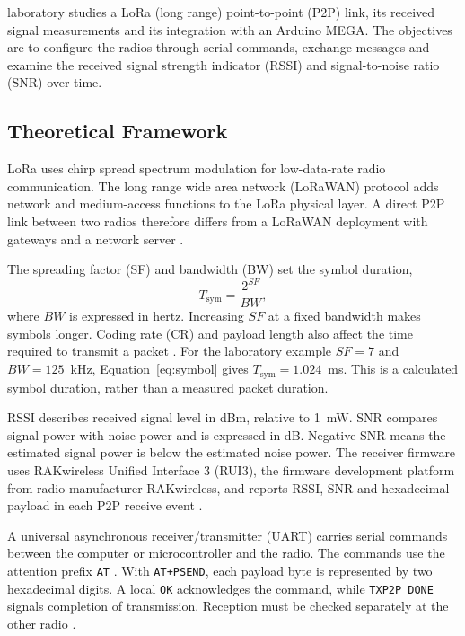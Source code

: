  laboratory studies a LoRa (long range) point-to-point (P2P) link, its received signal measurements and its integration with an Arduino MEGA. The objectives are to configure the radios through serial commands, exchange messages and examine the received signal strength indicator (RSSI) and signal-to-noise ratio (SNR) over time.

\subsection{Theoretical Framework}
LoRa uses chirp spread spectrum modulation for low-data-rate radio communication. The long range wide area network (LoRaWAN) protocol adds network and medium-access functions to the LoRa physical layer. A direct P2P link between two radios therefore differs from a LoRaWAN deployment with gateways and a network server \cite{augustin2016}.

The spreading factor (SF) and bandwidth (BW) set the symbol duration,
\begin{equation}
T_{\mathrm{sym}}=\frac{2^{SF}}{BW},
\label{eq:symbol}
\end{equation}
where $BW$ is expressed in hertz. Increasing $SF$ at a fixed bandwidth makes symbols longer. Coding rate (CR) and payload length also affect the time required to transmit a packet \cite{augustin2016}. For the laboratory example $SF=7$ and $BW=125$~kHz, Equation~\ref{eq:symbol} gives $T_{\mathrm{sym}}=1.024$~ms. This is a calculated symbol duration, rather than a measured packet duration.

RSSI describes received signal level in dBm, relative to 1~mW. SNR compares signal power with noise power and is expressed in dB. Negative SNR means the estimated signal power is below the estimated noise power. The receiver firmware uses RAKwireless Unified Interface 3 (RUI3), the firmware development platform from radio manufacturer RAKwireless, and reports RSSI, SNR and hexadecimal payload in each P2P receive event \cite{rui3}.

A universal asynchronous receiver/transmitter (UART) carries serial commands between the computer or microcontroller and the radio. The commands use the attention prefix \texttt{AT} \cite{rui3}. With \texttt{AT+PSEND}, each payload byte is represented by two hexadecimal digits. A local \texttt{OK} acknowledges the command, while \texttt{TXP2P DONE} signals completion of transmission. Reception must be checked separately at the other radio \cite{rui3}.

